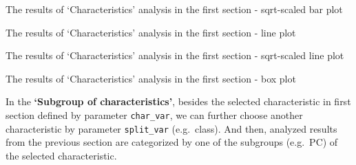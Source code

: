 \documentclass[]{article}
\newcommand{\hlcom}[1]{\textcolor[rgb]{0.502,0.502,0.502}{\textit{#1}}}%
\newcommand{\hlopt}[1]{\textcolor[rgb]{0,0,0}{#1}}%
\newcommand{\hlstd}[1]{\textcolor[rgb]{0.251,0.251,0.251}{#1}}%
\newenvironment{Shaded}{\begin{myshaded}}{\end{myshaded}}
\newcommand{\CommentTok}[1]{\hlcom{#1}}
\newcommand{\OperatorTok}[1]{\hlopt{#1}}
\newcommand{\NormalTok}[1]{\hlstd{#1}}
\begin{document}
\label{fig:unnamed-chunk-37}The results of `Characteristics' analysis in the first section - sqrt-scaled bar plot

\begin{Shaded}
\end{Shaded}

\label{fig:unnamed-chunk-38}The results of `Characteristics' analysis in the first section - line plot

\begin{Shaded}
\end{Shaded}

\label{fig:unnamed-chunk-39}The results of `Characteristics' analysis in the first section - sqrt-scaled line plot

\begin{Shaded}
\end{Shaded}

\label{fig:unnamed-chunk-40}The results of `Characteristics' analysis in the first section - box plot

In the \textbf{`Subgroup of characteristics'}, besides the selected characteristic in first section defined by parameter \texttt{char\_var}, we can further choose another characteristic by parameter \texttt{split\_var} (e.g.~class). And then, analyzed results from the previous section are categorized by one of the subgroups (e.g.~PC) of the selected characteristic.
\end{document}
